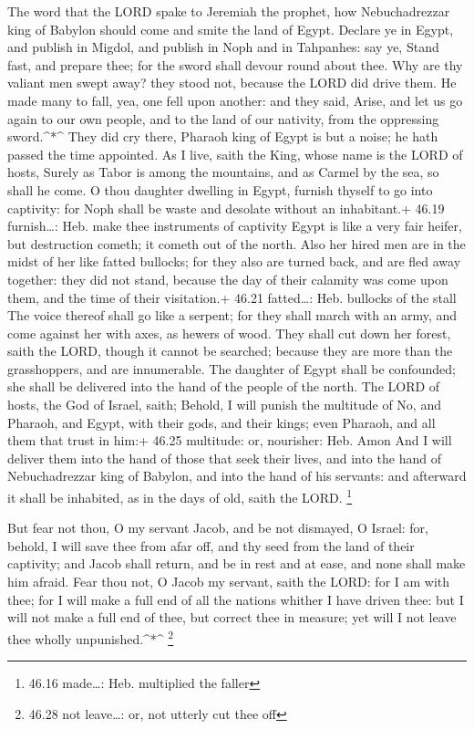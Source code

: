  The word that the LORD spake to Jeremiah the prophet, how
Nebuchadrezzar king of Babylon should come and smite the land of Egypt.
 Declare ye in Egypt, and publish in Migdol, and publish in
Noph and in Tahpanhes: say ye, Stand fast, and prepare thee; for the
sword shall devour round about thee.  Why are thy valiant
men swept away? they stood not, because the LORD did drive them.
 He made many to fall, yea, one fell upon another: and they
said, Arise, and let us go again to our own people, and to the land of
our nativity, from the oppressing sword.\^{}*\^{}  They did
cry there, Pharaoh king of Egypt is but a noise; he hath passed the time
appointed.  As I live, saith the King, whose name is the
LORD of hosts, Surely as Tabor is among the mountains, and as Carmel by
the sea, so shall he come.  O thou daughter dwelling in
Egypt, furnish thyself to go into captivity: for Noph shall be waste and
desolate without an inhabitant.+ 46.19 furnish\ldots: Heb. make thee
instruments of captivity  Egypt is like a very fair heifer,
but destruction cometh; it cometh out of the north.  Also
her hired men are in the midst of her like fatted bullocks; for they
also are turned back, and are fled away together: they did not stand,
because the day of their calamity was come upon them, and the time of
their visitation.+ 46.21 fatted\ldots: Heb. bullocks of the stall
 The voice thereof shall go like a serpent; for they shall
march with an army, and come against her with axes, as hewers of wood.
 They shall cut down her forest, saith the LORD, though it
cannot be searched; because they are more than the grasshoppers, and are
innumerable.  The daughter of Egypt shall be confounded;
she shall be delivered into the hand of the people of the north.
 The LORD of hosts, the God of Israel, saith; Behold, I
will punish the multitude of No, and Pharaoh, and Egypt, with their
gods, and their kings; even Pharaoh, and all them that trust in him:+
46.25 multitude: or, nourisher: Heb. Amon  And I will
deliver them into the hand of those that seek their lives, and into the
hand of Nebuchadrezzar king of Babylon, and into the hand of his
servants: and afterward it shall be inhabited, as in the days of old,
saith the LORD. \footnote{46.16 made\ldots: Heb. multiplied the faller}

 But fear not thou, O my servant Jacob, and be not
dismayed, O Israel: for, behold, I will save thee from afar off, and thy
seed from the land of their captivity; and Jacob shall return, and be in
rest and at ease, and none shall make him afraid.  Fear
thou not, O Jacob my servant, saith the LORD: for I am with thee; for I
will make a full end of all the nations whither I have driven thee: but
I will not make a full end of thee, but correct thee in measure; yet
will I not leave thee wholly unpunished.\^{}*\^{} \footnote{46.28 not
  leave\ldots: or, not utterly cut thee off}

